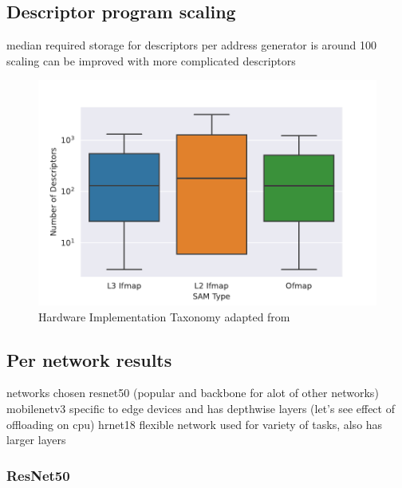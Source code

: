 \subsection{Descriptor program scaling}
\label{chap:hero:sim_platform:cigar_side}

median required storage for descriptors per address generator is around 100
scaling can be improved with more complicated descriptors

\begin{figure}[ht]
    \centering
    \includegraphics[scale=0.58]{Plots/resources/descriptors.pdf}
    \caption{Hardware Implementation Taxonomy adapted from \cite{maestro}}
    \label{fig:hw_taxonomy}
\end{figure}

\subsection{Per network results}
\label{chap:hero:sim_platform:cigar_side}

networks chosen
resnet50 (popular and backbone for alot of other networks)
mobilenetv3 specific to edge devices and has depthwise layers (let's see effect
of offloading on cpu)
hrnet18 flexible network used for variety of tasks, also has larger layers

\subsubsection{ResNet50}

